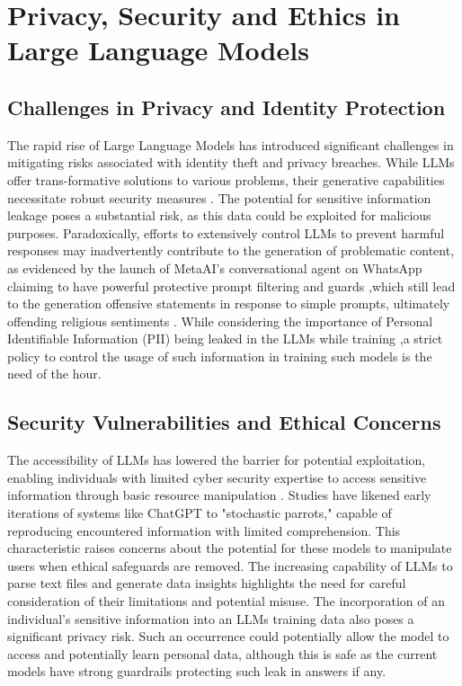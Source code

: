 \documentclass[pdflatex,sn-mathphys-num]{sn-jnl}%
\theoremstyle{thmstyleone}%
\theoremstyle{thmstyletwo}%
\theoremstyle{thmstylethree}%
\begin{document}
\section{Privacy, Security and Ethics in Large Language Models}

\subsection{Challenges in Privacy and Identity Protection}
The rapid rise of Large Language Models has introduced significant challenges in mitigating risks associated with identity theft and privacy breaches. While LLMs offer trans-formative solutions to various problems, their generative capabilities necessitate robust security measures \cite{yan2024protecting}. The potential for sensitive information leakage poses a substantial risk, as this data could be exploited for malicious purposes. Paradoxically, efforts to extensively control LLMs to prevent harmful responses may inadvertently contribute to the generation of problematic content, as evidenced by the launch of MetaAI's conversational agent on WhatsApp claiming to have powerful protective prompt filtering and guards \cite{inan2023llama},which still lead to the generation offensive statements in response to simple prompts, ultimately offending religious sentiments \cite{Pal_2024}. While considering the importance of Personal Identifiable Information (PII) being leaked in the LLMs while training \cite{lukas2023analyzing},a strict policy to control the usage of such information in training such models is the need of the hour.

\subsection{Security Vulnerabilities and Ethical Concerns}
The accessibility of LLMs has lowered the barrier for potential exploitation, enabling individuals with limited cyber security expertise to access sensitive information through basic resource manipulation \cite{ethic1, ethic2}. Studies have likened early iterations of systems like ChatGPT to "stochastic parrots," capable of reproducing encountered information with limited comprehension\cite{sparrot1, sparrot2, sparrot3}. This characteristic raises concerns about the potential for these models to manipulate users when ethical safeguards are removed. The increasing capability of LLMs to parse text files and generate data insights\cite{nejjar2023llms} highlights the need for careful consideration of their limitations and potential misuse. The incorporation of an individual's sensitive information into an LLMs training data also poses a significant privacy risk. Such an occurrence could potentially allow the model to access and potentially learn personal data, although this is safe as the current models have strong guardrails protecting such leak in answers if any.
\end{document}
